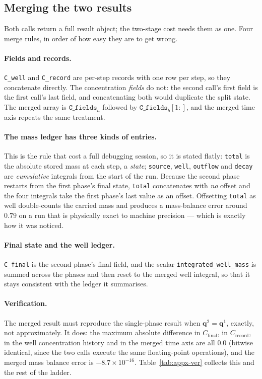 \documentclass[11pt]{article}
\newcommand{\qq}{\mathbf{q}}
\begin{document}
\subsection{Merging the two results}

Both calls return a full result object; the two-stage cost needs them as one.
Four merge rules, in order of how easy they are to get wrong.

\paragraph{Fields and records.} \texttt{C\_well} and \texttt{C\_record} are
per-step records with one row per step, so they concatenate directly. The
concentration \emph{fields} do not: the second call's first field is the first
call's last field, and concatenating both would duplicate the split state. The
merged array is $\texttt{C\_fields}_a$ followed by $\texttt{C\_fields}_b[1:]$,
and the merged time axis repeats the same treatment.

\paragraph{The mass ledger has three kinds of entries.} This is the rule that
cost a full debugging session, so it is stated flatly: \texttt{total} is the
absolute stored mass at each step, a \emph{state}; \texttt{source},
\texttt{well}, \texttt{outflow} and \texttt{decay} are \emph{cumulative}
integrals from the start of the run. Because the second phase restarts from the
first phase's final state, \texttt{total} concatenates with \emph{no} offset and
the four integrals take the first phase's last value as an offset. Offsetting
\texttt{total} as well double-counts the carried mass and produces a mass-balance
error around $0.79$ on a run that is physically exact to machine precision ---
which is exactly how it was noticed.

\paragraph{Final state and the well ledger.} \texttt{C\_final} is the second
phase's final field, and the scalar \texttt{integrated\_well\_mass} is summed
across the phases and then reset to the merged well integral, so that it stays
consistent with the ledger it summarises.

\paragraph{Verification.} The merged result must reproduce the single-phase
result when $\qq^{2}=\qq^{1}$, exactly, not approximately. It does: the maximum
absolute difference in $C_{\mathrm{final}}$, in $C_{\mathrm{record}}$, in the
well concentration history and in the merged time axis are all $0.0$ (bitwise
identical, since the two calls execute the same floating-point operations), and
the merged mass balance error is $-8.7\times10^{-16}$. Table~\ref{tab:appx-ver}
collects this and the rest of the ladder.
\end{document}

